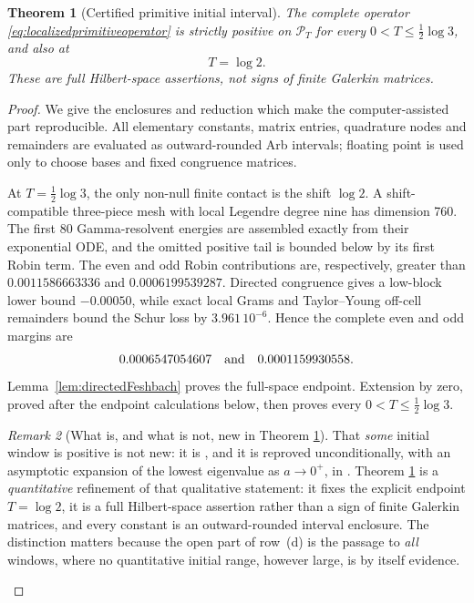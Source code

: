 \documentclass[11pt]{amsart}
\newtheorem{theorem}{Theorem}[section]
\theoremstyle{definition}
\theoremstyle{remark}
\newtheorem{remark}[theorem]{Remark}
\begin{document}
\begin{theorem}[Certified primitive initial interval]\label{thm:certifiedendpoints}
The complete operator \eqref{eq:localizedprimitiveoperator} is strictly
positive on \(\mathcal P_T\) for every \(0<T\le\frac12\log3\), and also at
\[
 T=\log2.
\]
These are full Hilbert-space assertions, not signs of finite Galerkin
matrices.
\end{theorem}

\begin{proof}
We give the enclosures and reduction which make the computer-assisted part
reproducible.  All elementary constants, matrix entries, quadrature nodes
and remainders are evaluated as outward-rounded Arb intervals; floating
point is used only to choose bases and fixed congruence matrices.

At \(T=\frac12\log3\), the only non-null finite contact is the shift
\(\log2\).  A shift-compatible three-piece mesh with local Legendre degree
nine has dimension 760.  The first 80 Gamma-resolvent energies are assembled
exactly from their exponential ODE, and the omitted positive tail is bounded
below by its first Robin term.  The even and odd Robin contributions are,
respectively, greater than
\(0.0011586663336\) and \(0.0006199539287\).  Directed congruence gives a
low-block lower bound \(-0.00050\), while exact local Grams and Taylor--Young
off-cell remainders bound the Schur loss by \(3.961\,10^{-6}\).  Hence the
complete even and odd margins are
\[
 0.0006547054607\quad\hbox{and}\quad0.0001159930558.
\]
Lemma~\ref{lem:directedFeshbach} proves the full-space endpoint.  Extension
by zero, proved after the endpoint calculations below, then proves every
\(0<T\le\frac12\log3\).

\begin{remark}[What is, and what is not, new in Theorem
\ref{thm:certifiedendpoints}]
\label{rem:yoshidacalibration}
That \emph{some} initial window is positive is not new: it is
\cite[Lemma~2]{Yoshida1992}, and it is reproved unconditionally, with an
asymptotic expansion of the lowest eigenvalue as \(a\to0^+\), in
\cite[Theorem~1.4]{SuzukiScrew}.  Theorem \ref{thm:certifiedendpoints} is a
\emph{quantitative} refinement of that qualitative statement: it fixes the
explicit endpoint \(T=\log2\), it is a full Hilbert-space assertion rather
than a sign of finite Galerkin matrices, and every constant is an
outward-rounded interval enclosure.  The distinction matters because the
open part of row~(d) is the passage to \emph{all} windows, where no
quantitative initial range, however large, is by itself evidence.
\end{remark}


\end{proof}
\end{document}
